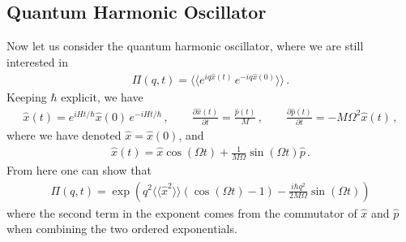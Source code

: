 \documentclass[11pt, oneside]{book}
\makeatletter
\newenvironment{latticefigure}
  {\par\addvspace{\intextsep}\noindent\begin{minipage}{\linewidth}\def\@captype{figure}}
  {\end{minipage}\par\addvspace{\intextsep}}
\theoremstyle{break}
\theoremstyle{break}
\newcommand{\pd}{\partial}
\makeatother
\begin{document}
\begin{latticefigure}
\centering
{}
\caption{The classical oscillator spectrum consists of delta functions at $\omega=n\Omega$. The arrow lengths show their weights $W_n=e^{-A}I_n(A)$, where $A=q^2\langle\langle x_0^2\rangle\rangle=q^2k_{\text{B}}T/(M\Omega^2)$; here $A=4$ is an example. Thus $S(q,\omega)=2\pi\sum_n W_n\delta(\omega-n\Omega)$. The weights are symmetric, $W_{-n}=W_n$, and the central peak is elastic. The spacing is $\Omega$; the tails continue beyond the peaks shown, with no sharp cutoff at $k_{\text{B}}T/\hbar$.}
\label{fig:classical-oscillator-spectrum}
\end{latticefigure}

\subsection{Quantum Harmonic Oscillator}
Now let us consider the quantum harmonic oscillator, where we are still interested in 
\begin{align*}
\Pi(q,t) = \langle \langle e^{iq \hat{x}(t)}\, e^{-iq\hat{x}(0)}\rangle\rangle\,.
\end{align*}
Keeping $\hbar$ explicit, we have
\begin{align*}
\hat{x}(t) = e^{iHt/\hbar}\hat{x}(0) \, e^{-iH t/\hbar}\,,\qquad
\frac{\pd\hat{x}(t)}{\pd t} = \frac{\hat{p}(t)}{M}\,,\qquad
\frac{\pd\hat{p}(t)}{\pd t} = -M\Omega^2 \hat{x}(t)\,,
\end{align*}
where we have denoted $\hat{x} = \hat{x}(0)$, and 
\begin{align*}
\hat{x}(t) = \hat{x}\cos(\Omega t) + \frac{1}{M\Omega}\sin(\Omega t) \hat{p}\,.
\end{align*}
From here one can show that 
\begin{align*}
\Pi(q,t) = \exp\left(q^2\langle\langle \hat{x}^2\rangle\rangle \left( \cos(\Omega t) -1 \right) - \frac{i\hbar q^2}{2M\Omega}\sin(\Omega t)\right)
\end{align*}
where the second term in the exponent comes from the commutator of $\hat{x}$ and $\hat{p}$ when combining the two ordered exponentials.\\
\end{document}
